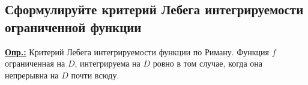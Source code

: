 
\subsection{Сформулируйте критерий Лебега интегрируемости ограниченной функции}

\textbf{\underline{Опр.:} } Критерий Лебега интегрируемости функции по Риману. Функция $f$ ограниченная на $D$, интегрируема на $D$ ровно в том случае, когда она непрерывна на $D$ почти всюду.


